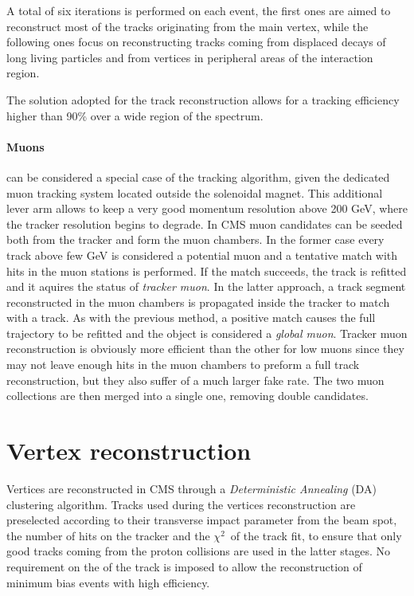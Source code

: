 A total of six iterations is performed on each event, the first ones are aimed to reconstruct most of the tracks originating from the main vertex, while the following ones focus on reconstructing tracks coming from displaced decays of long living particles and from vertices in peripheral areas of the interaction region.

The solution adopted for the track reconstruction allows for a tracking efficiency higher than 90\% over a wide region of the \pT spectrum.

\paragraph{Muons} can be considered a special case of the tracking algorithm, given the dedicated muon tracking system located outside the solenoidal magnet. This additional lever arm allows to keep a very good momentum resolution above 200 GeV, where the tracker resolution begins to degrade. In CMS muon candidates can be seeded both from the tracker and form the muon chambers. In the former case every track above few GeV is considered a potential muon and a tentative match with hits in the muon stations is performed. If the match succeeds, the track is refitted and it aquires the status of \emph{tracker muon}. In the latter approach, a track segment reconstructed in the muon chambers is propagated inside the tracker to match with a track. As with the previous method, a positive match causes the full trajectory to be refitted and the object is considered a \emph{global muon}. Tracker muon reconstruction is obviously more efficient than the other for low \pT muons since they may not leave enough hits in the muon chambers to preform a full track reconstruction, but they also suffer of a much larger fake rate. The two muon collections are then merged into a single one, removing double candidates.

\section{Vertex reconstruction}

Vertices are reconstructed in CMS through a \emph{Deterministic Annealing} (DA) \cite{IEEE_DetAnnealing} clustering algorithm. Tracks used during the vertices reconstruction are preselected according to their transverse impact parameter from the beam spot, the number of hits on the tracker and the $\chi^2$\ of the track fit, to ensure that only good tracks coming from the proton collisions are used in the latter stages. No requirement on the \pT of the track is imposed to allow the reconstruction of minimum bias events with high efficiency.

